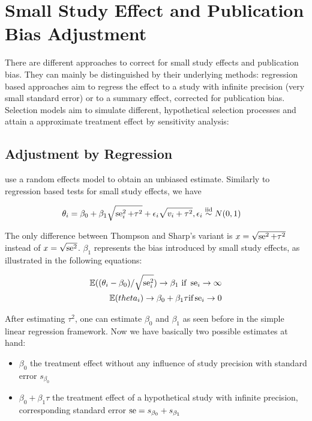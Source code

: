 \documentclass[11pt,a4paper,twoside]{book}\usepackage[]{graphicx}\usepackage[]{color}
\begin{document}
\section{Small Study Effect and Publication Bias Adjustment}
There are different approaches to correct for small study effects and publication bias. They can mainly be distinguished by their underlying methods: regression based approaches aim to regress the effect to a study with infinite precision (\ie very small standard error) or to a summary effect, corrected for publication bias. Selection models aim to simulate different, hypothetical selection processes and attain a approximate treatment effect by sensitivity analysis:

\subsection{Adjustment by Regression} \label{sec:regression.adjustment}
\citet{limitmeta} use a random effects model %
to obtain an unbiased estimate. Similarly to 
regression based tests for small study effects, we have

\begin{align}
\theta_i & = \beta_0 + \beta_1\sqrt{\se_i^2 + \tau^2} + \epsilon_i\sqrt{v_i + \tau^2}, \epsilon_i \stackrel{\textrm{iid}}{\sim} N(0,1)  \label{eq:limitmeta.regression}
\end{align}

The only difference between Thompson and Sharp's variant is $x = \sqrt{\operatorname{se}^2 + \tau^2}$ instead of $x = \sqrt{\operatorname{se}^2}$. $\beta_{1}$ represents the bias introduced by small study effects, as illustrated in the following equations:

\begin{align}
\mathbb{E}((\theta_i - \beta_0)/\sqrt{\se_i^2}) \rightarrow \beta_1 \textrm{ if } \se_i \rightarrow \infty \nonumber \\ %
\mathbb{E}(theta_i) \rightarrow \beta_0 + \beta_1 \tau \textrm{if} \se_i \rightarrow 0 \nonumber
\end{align}

After estimating $\tau^2$, one can estimate $\beta_{0}$ and $\beta_{1}$ as seen before in the simple linear regression framework. Now we have basically two possible estimates at hand:
\begin{itemize}
\item $\beta_0$ the treatment effect without any influence of study precision with standard error $s_{\beta_0}$
\item $\beta_0 + \beta_1 \tau$ the treatment effect of a hypothetical study with infinite precision, corresponding standard error $\operatorname{se} = s_{\beta_0} + s_{\beta_1}$
\end{itemize}
\end{document}
